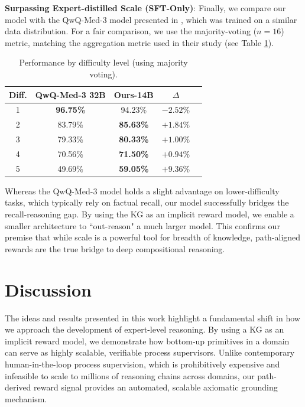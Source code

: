 \documentclass{article}
\theoremstyle{plain}
\theoremstyle{definition}
\theoremstyle{remark}
\begin{document}
\textbf{Surpassing Expert-distilled Scale (SFT-Only)}: Finally, we compare our model with the QwQ-Med-3 model presented in \cite{Dedhia2025Bottom-upNeed}, which was trained on a similar data distribution. For a fair comparison, we use the majority-voting ($n=16$) metric, matching the aggregation metric used in their study (see Table \ref{tab:difficulty}).

\begin{table}[ht]
\caption{Performance by difficulty level (using majority voting).}
\label{tab:difficulty}
\vskip 0.15in
\begin{center}
\begin{small}
\begin{sc}
\begin{tabular}{ccccc}
\toprule
Diff. & QwQ-Med-3 32B & Ours-14B & $\Delta$ \\
\midrule
1 & \textbf{96.75\%} & 94.23\% & $-2.52\%$ \\
2 & 83.79\% & \textbf{85.63\%} & $+1.84\%$ \\
3 & 79.33\% & \textbf{80.33\%} & $+1.00\%$ \\
4 & 70.56\% & \textbf{71.50\%} & $+0.94\%$ \\
5 & 49.69\% & \textbf{59.05\%} & $+9.36\%$ \\
\bottomrule
\end{tabular}
\end{sc}
\end{small}
\end{center}
\vskip -0.1in
\end{table}

Whereas the QwQ-Med-3 model holds a slight advantage on lower-difficulty tasks, which typically rely on factual recall, our model successfully bridges the recall-reasoning gap. By using the KG as an implicit reward model, we enable a smaller architecture to ``out-reason" a much larger model. This confirms our premise that while scale is a powerful tool for breadth of knowledge, path-aligned rewards are the true bridge to deep compositional reasoning.

\section{Discussion}

The ideas and results presented in this work highlight a fundamental shift in how we approach the development of expert-level reasoning. By using a KG as an implicit reward model, we demonstrate how bottom-up primitives in a domain can serve as highly scalable, verifiable process supervisors. Unlike contemporary human-in-the-loop process supervision, which is prohibitively expensive and infeasible to scale to millions of reasoning chains across domains, our path-derived reward signal provides an automated, scalable axiomatic grounding mechanism. 
\end{document}
